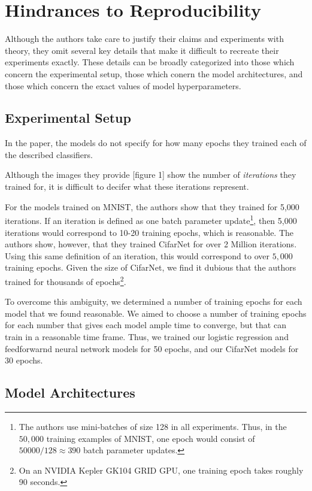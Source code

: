 \documentclass[letterpaper, 10 pt, conference]{ieeeconf}  %
\begin{document}
    
\section{Hindrances to Reproducibility}  

Although the authors take care to justify their claims and experiments with theory, they omit several key details that make it difficult to recreate their experiments exactly. These details can be broadly categorized into those which concern the experimental setup, those which conern the model architectures, and those which concern the exact values of model hyperparameters. 

\subsection{Experimental Setup}

In the paper, the models do not specify for how many epochs they trained each of the described classifiers.

Although the images they provide [figure 1] show the number of \emph{iterations} they trained for, it is difficult to decifer what these iterations represent. 

For the models trained on MNIST, the authors show that they trained for 5,000 iterations. If an iteration is defined as one batch parameter update\footnote{The authors use mini-batches of size 128 in all experiments. Thus, in the $50,000$ training examples of MNIST, one epoch would consist of $50000/128 \approx 390$ batch parameter updates.}, then 5,000 iterations would correspond to 10-20 training epochs, which is reasonable. The authors show, however, that they trained CifarNet for over 2 Million iterations. Using this same definition of an iteration, this would correspond to over $5,000$ training epochs. Given the size of CifarNet, we find it dubious that the authors trained for thousands of epochs\footnote{On an NVIDIA Kepler GK104 GRID GPU, one training epoch takes roughly 90 seconds.}.

To overcome this ambiguity, we determined a number of training epochs for each model that we found reasonable. We aimed to choose a number of training epochs for each number that gives each model ample time to converge, but that can train in a reasonable time frame. Thus, we trained our logistic regression and feedforwarnd neural network models for 50 epochs, and our CifarNet models for 30 epochs. 

\subsection{Model Architectures}
\end{document}
